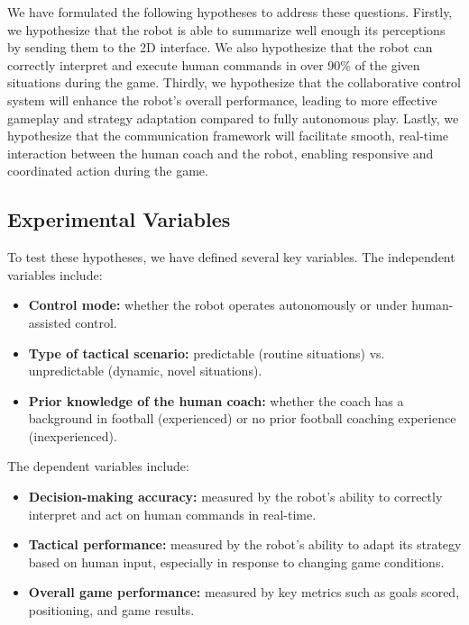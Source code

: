 \documentclass[a4paper, onecolumn, 12pt]{article}
\begin{document}
We have formulated the following hypotheses to address these questions. Firstly, we hypothesize that the robot is able to summarize well enough its perceptions by sending them to the 2D interface. We also hypothesize that the robot can correctly interpret and execute human commands in over 90\% of the given situations during the game. Thirdly, we hypothesize that the collaborative control system will enhance the robot's overall performance, leading to more effective gameplay and strategy adaptation compared to fully autonomous play. Lastly, we hypothesize that the communication framework will facilitate smooth, real-time interaction between the human coach and the robot, enabling responsive and coordinated action during the game.

\subsection{Experimental Variables}

To test these hypotheses, we have defined several key variables. The independent variables include:

\begin{itemize}
    \item \textbf{Control mode:} whether the robot operates autonomously or under human-assisted control.
    \item \textbf{Type of tactical scenario:} predictable (routine situations) vs. unpredictable (dynamic, novel situations).
    \item \textbf{Prior knowledge of the human coach:} whether the coach has a background in football (experienced) or no prior football coaching experience (inexperienced).
\end{itemize}

The dependent variables include:

\begin{itemize}
    \item \textbf{Decision-making accuracy:} measured by the robot's ability to correctly interpret and act on human commands in real-time.
    \item \textbf{Tactical performance:} measured by the robot's ability to adapt its strategy based on human input, especially in response to changing game conditions.
    \item \textbf{Overall game performance:} measured by key metrics such as goals scored, positioning, and game results.
\end{itemize}
\end{document}
